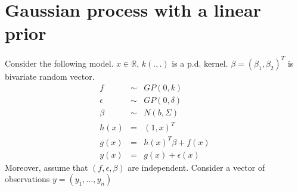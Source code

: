 \documentclass{article}[12pt]
\begin{document}
\section{Gaussian process with a linear prior}
Consider the following model. $x \in \mathbb{R}$, $k(.,.)$ is a p.d. kernel. $\beta=(\beta_1,\beta_2)^T$ is bivariate random vector.   
\begin{eqnarray}
f & \sim & GP(0,k)\\
\epsilon & \sim & GP(0,\delta) \\
\beta & \sim & N(b,\Sigma) \\
h(x) & = & (1,x)^T\\
g(x) & = & h(x)^T \beta + f(x)\\
y(x) &=& g(x) + \epsilon(x) 
\end{eqnarray}
Moreover, assume that $(f,\epsilon,\beta)$ are independent. Consider a vector of observations $y=(y_1,\ldots,y_n)$ 
\end{document}
